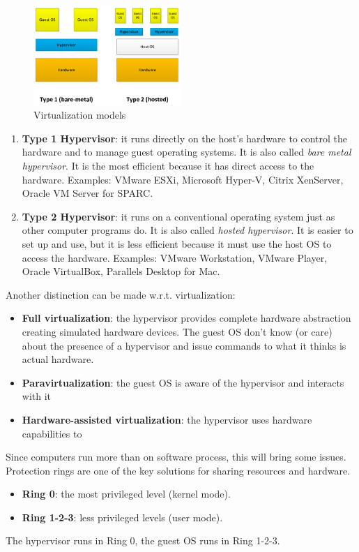 \begin{figure}[H]
    \centering
    \includegraphics[width=0.5\textwidth]{assets/fig29.png}
    \caption{Virtualization models}
\end{figure}

\begin{enumerate}
    \item \textbf{Type 1 Hypervisor}: it runs directly on the host's hardware to control the hardware and to manage guest operating systems. It is also called \textit{bare metal hypervisor}. It is the most efficient because it has direct access to the hardware. Examples: VMware ESXi, Microsoft Hyper-V, Citrix XenServer, Oracle VM Server for SPARC.
    \item \textbf{Type 2 Hypervisor}: it runs on a conventional operating system just as other computer programs do. It is also called \textit{hosted hypervisor}. It is easier to set up and use, but it is less efficient because it must use the host OS to access the hardware. Examples: VMware Workstation, VMware Player, Oracle VirtualBox, Parallels Desktop for Mac.
\end{enumerate}

Another distinction can be made w.r.t. virtualization:
\begin{itemize}
    \item \textbf{Full virtualization}: the hypervisor provides complete hardware abstraction creating
    simulated hardware devices. The guest OS don’t know (or care) about the presence
    of a hypervisor and issue commands to what it thinks is actual hardware.
    \item \textbf{Paravirtualization}: the guest OS is aware of the hypervisor and interacts with it
    \item \textbf{Hardware-assisted virtualization}: the hypervisor uses hardware capabilities to
\end{itemize}

\begin{warningblock}
    Since computers run more than on software process, this will bring some issues. Protection rings are one of the key solutions for sharing resources and hardware.
    \begin{itemize}
        \item \textbf{Ring 0}: the most privileged level (kernel mode).
        \item \textbf{Ring 1-2-3}: less privileged levels (user mode).
    \end{itemize}
    The hypervisor runs in Ring 0, the guest OS runs in Ring 1-2-3.
\end{warningblock}

